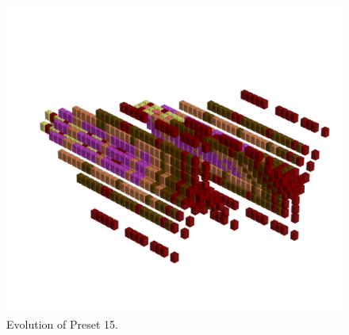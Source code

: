 \clearpage                                                                 
\begin{figure}[H]                                                          
  \centering                                                             
  \begin{adjustbox}{width=14cm,center}                                   
  \includegraphics[width=14cm]{src/presets/pattern14-45.png}%
  \end{adjustbox}                                                        
\caption{Evolution of Preset 15.}                                           
\end{figure}                                                               
\clearpage                                                                 
                                                                           
